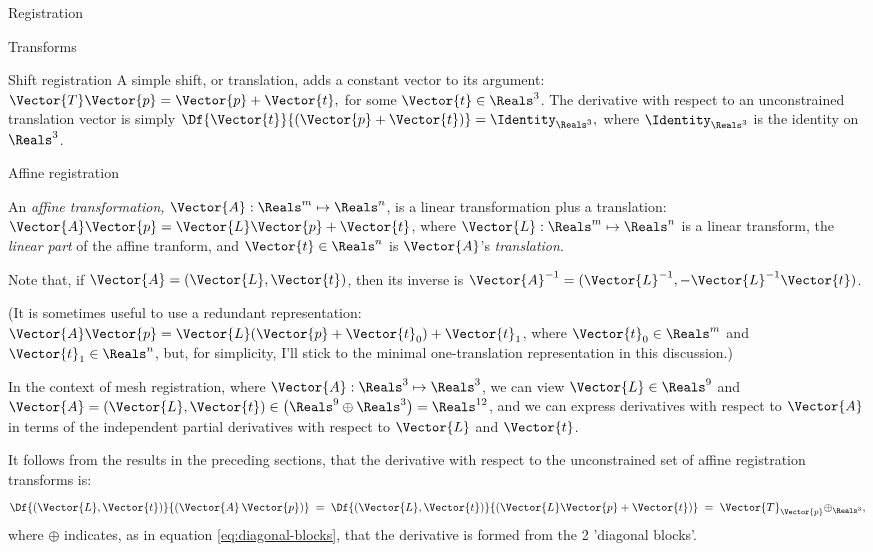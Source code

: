 \begin{plSection}{Registration}
\begin{plSection}{Transforms}
\begin{plSection}{Shift registration}
A simple shift, or translation, adds a constant vector
to its argument: $\Vector{T} \Vector{p} = \Vector{p} + \Vector{t},$
for some $\Vector{t} \in \Reals^3$.
The derivative with respect to
an unconstrained translation vector
is simply
$\Df{\Vector{t}}{(\Vector{p} + \Vector{t})} = \Identity_{\Reals^3},$
where $\Identity_{\Reals^3}$ is the identity on $\Reals^3$.

\end{plSection}%
\begin{plSection}{Affine registration}
\label{sec:affine-registration}

An {\it affine transformation,} $\Vector{A} : \Reals^m \mapsto \Reals^n$,
is a linear transformation plus a translation:
$\Vector{A} \Vector{p} = \Vector{L} \Vector{p} + \Vector{t}$,
where $\Vector{L} : \Reals^m \mapsto \Reals^n$ is a linear transform,
the {\it linear part} of the affine tranform,
and $\Vector{t} \in \Reals^n$ is $\Vector{A}$'s {\it translation}.

Note that, if $\Vector{A} = (\Vector{L},\Vector{t})$, then its inverse is
$\Vector{A}^{-1} = (\Vector{L}^{-1}, - \Vector{L}^{-1}\Vector{t})$.

(It is sometimes useful to use a redundant representation:
$\Vector{A} \Vector{p} = \Vector{L} (\Vector{p} + \Vector{t}_0) + \Vector{t}_1$,
where $\Vector{t}_0 \in \Reals^m$ and $\Vector{t}_1 \in \Reals^n$,
but, for simplicity, I'll stick to the minimal one-translation
representation in this discussion.)

In the context of mesh registration,
where $\Vector{A} : \Reals^3 \mapsto \Reals^3$,
we can view $\Vector{L} \in \Reals^9$ and
$\Vector{A} = (\Vector{L}, \Vector{t}) \in \left(\Reals^9 \oplus \Reals^3 \right)= \Reals^{12}$,
and we can express derivatives with respect to $\Vector{A}$
in terms of the independent partial derivatives
with respect to $\Vector{L}$ and $\Vector{t}$.

It follows from the results in the preceding sections,
that the derivative with respect to the
unconstrained set of affine registration transforms is:
\begin{equation}
\label{eq:affine-transform-derivative}
\Df{(\Vector{L},\Vector{t})}{\left( \Vector{A} \, \Vector{p} \right)}
 \; = \;
\Df{(\Vector{L},\Vector{t})}{\left( \Vector{L} \Vector{p} + \Vector{t} \right)}
 \; = \;
\Vector{T}_{\Vector{p}} \oplus _{\Reals^3},
\end{equation}
where $\oplus$ indicates,
as in equation \ref{eq:diagonal-blocks},
that the derivative is formed from the 2
'diagonal blocks'.


\end{plSection}
\end{plSection}
\end{plSection}
